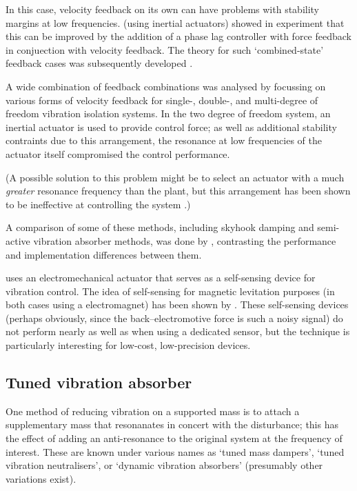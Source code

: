 In this case, velocity feedback on its own can have problems with stability
margins at low frequencies. \textcite{benassi2002a} (using inertial actuators)
showed in experiment that this can be improved by the addition of a phase lag
controller with force feedback in conjuection with velocity feedback. The
theory for such `combined-state' feedback cases was subsequently developed
\cite{benassi2002b}.

A wide combination of feedback combinations was analysed by
\textcite{diaz2005} focussing on various forms of velocity feedback for
single-, double-, and multi-degree of freedom vibration isolation systems. In
the two degree of freedom system, an inertial actuator is used to provide
control force; as well as additional stability contraints due to this
arrangement, the resonance at low frequencies of the actuator itself
compromised the control performance.

(A possible solution to this problem might be to select an actuator with a
much \emph{greater} resonance frequency than the plant, but this arrangement
has been shown to be ineffective at controlling the system
\cite[][Appendix~A]{benassi2002}.)

A comparison of some of these methods, including skyhook damping and
semi-active vibration absorber methods, was done by \textcite{huyanan2007},
contrasting the performance and implementation differences between them.

\textcite{paulitsch2003} uses an electromechanical actuator that serves as a
self-sensing device for vibration control. The idea of self-sensing for
magnetic levitation purposes (in both cases using a electromagnet) has been
shown by \textcite{bleuler1992,vischer1993}. These self-sensing devices
(perhaps obviously, since the back--electromotive force is such a noisy
signal) do not perform nearly as well as when using a dedicated sensor, but
the technique is particularly interesting for low-cost, low-precision devices.





\subsection{Tuned vibration absorber}

One method of reducing vibration on a supported mass is to attach a
supplementary mass that resonanates in concert with the disturbance; this has
the effect of adding an anti-resonance to the original system at the frequency
of interest. These are known under various names as `tuned mass dampers',
`tuned vibration neutralisers', or `dynamic vibration absorbers' (presumably
other variations exist).


